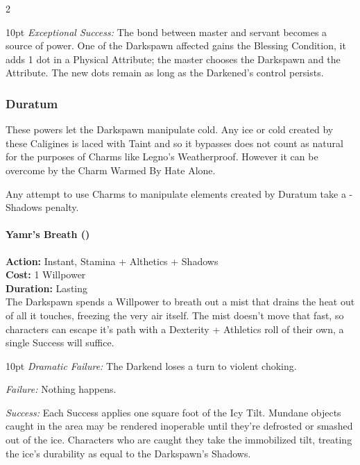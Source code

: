 \begin{multicols}{2}
\begin{myindentpar}{10pt}
    \emph{Exceptional Success:} The bond between master and servant becomes a source of power. One of the Darkspawn affected gains the Blessing Condition, it adds 1 dot in a Physical Attribute; the master chooses the Darkspawn and the Attribute. The new dots remain as long as the Darkened's control persists.\end{myindentpar}

\subsubsection*{Duratum}

These powers let the Darkspawn manipulate cold. Any ice or cold created by these Caligines is laced with Taint and so it bypasses does not count as natural for the purposes of Charms like Legno’s Weatherproof. However it can be overcome by the Charm Warmed By Hate Alone. 

Any attempt to use Charms to manipulate elements created by Duratum take a -Shadows penalty. 

\paragraph*{Yamr’s Breath (\textbullet\textbullet)}

\noindent \textbf{Action:} Instant, Stamina + Althetics + Shadows\\

\noindent \textbf{Cost:} 1 Willpower\\

\noindent \textbf{Duration:} Lasting \\

The Darkspawn spends a Willpower to breath out a mist that drains the heat out of all it touches, freezing the very air itself. The mist doesn’t move that fast, so characters can escape it’s path with a Dexterity + Athletics roll of their own, a single Success will suffice.

\begin{myindentpar}{10pt} \emph{Dramatic Failure:} The Darkend loses a turn to violent choking.

    \emph{Failure:} Nothing happens. 

    \emph{Success:}  Each Success applies one square foot of the Icy Tilt. Mundane objects caught in the area may be rendered inoperable until they’re defrosted or smashed out of the ice. Characters who are caught they take the immobilized tilt, treating the ice’s durability as equal to the Darkspawn’s Shadows. 


\end{myindentpar}
\end{multicols}
